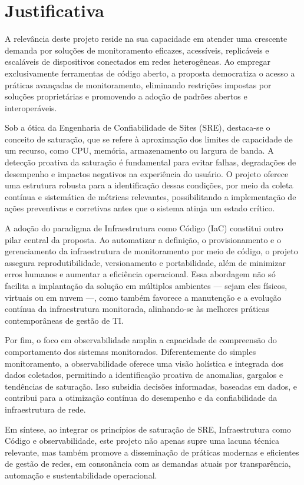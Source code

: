 \section{Justificativa}

A relevância deste projeto reside na sua capacidade em atender uma crescente demanda por soluções de monitoramento eficazes, acessíveis, replicáveis e escaláveis de dispositivos conectados em redes heterogêneas. Ao empregar exclusivamente ferramentas de código aberto, a proposta democratiza o acesso a práticas avançadas de monitoramento, eliminando restrições impostas por soluções proprietárias e promovendo a adoção de padrões abertos e interoperáveis.

Sob a ótica da Engenharia de Confiabilidade de Sites (SRE), destaca-se o conceito de saturação, que se refere à aproximação dos limites de capacidade de um recurso, como CPU, memória, armazenamento ou largura de banda.  A detecção proativa da saturação é fundamental para evitar falhas, degradações de desempenho e impactos negativos na experiência do usuário. O projeto oferece uma estrutura robusta para a identificação dessas condições, por meio da coleta contínua e sistemática de métricas relevantes, possibilitando a implementação de ações preventivas e corretivas antes que o sistema atinja um estado crítico.

A adoção do paradigma de Infraestrutura como Código (IaC) constitui outro pilar central da proposta. Ao automatizar a definição, o provisionamento e o gerenciamento da infraestrutura de monitoramento por meio de código, o projeto assegura reprodutibilidade, versionamento e portabilidade, além de minimizar erros humanos e aumentar a eficiência operacional. Essa abordagem não só facilita a implantação da solução em múltiplos ambientes — sejam eles físicos, virtuais ou em nuvem —, como também favorece a manutenção e a evolução contínua da infraestrutura monitorada, alinhando-se às melhores práticas contemporâneas de gestão de TI.

Por fim, o foco em observabilidade amplia a capacidade de compreensão do comportamento dos sistemas monitorados. Diferentemente do simples monitoramento, a observabilidade oferece uma visão holística e integrada dos dados coletados, permitindo a identificação proativa de anomalias, gargalos e tendências de saturação. Isso subsidia decisões informadas, baseadas em dados, e contribui para a otimização contínua do desempenho e da confiabilidade da infraestrutura de rede.

Em síntese, ao integrar os princípios de saturação de SRE, Infraestrutura como Código e observabilidade, este projeto não apenas supre uma lacuna técnica relevante, mas também promove a disseminação de práticas modernas e eficientes de gestão de redes, em consonância com as demandas atuais por transparência, automação e sustentabilidade operacional.

